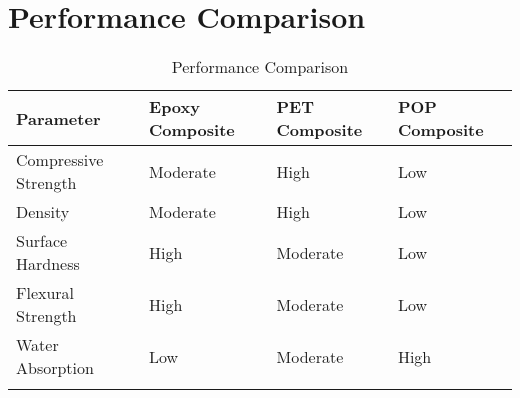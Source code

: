 \section{Performance Comparison}

\renewcommand{\arraystretch}{2} %
\setlength{\tabcolsep}{10pt} %
\begin{longtable}{
	|>{\centering\arraybackslash}m{3cm}|
	>{\centering\arraybackslash}m{3cm}|
	>{\centering\arraybackslash}m{3cm}|
	>{\centering\arraybackslash}m{3cm}|
	}
	\hline
	\rowcolor{gray!20}
	Parameter            & Epoxy Composite & PET Composite & POP Composite \\ \hline
	Compressive Strength & Moderate        & High          & Low           \\ \hline
	Density              & Moderate        & High          & Low           \\ \hline
	Surface Hardness     & High            & Moderate      & Low           \\ \hline
	Flexural Strength    & High            & Moderate      & Low           \\ \hline
	Water Absorption     & Low             & Moderate      & High          \\ \hline
	\caption{Performance Comparison  }
	\label{tab:placeholder}
\end{longtable}